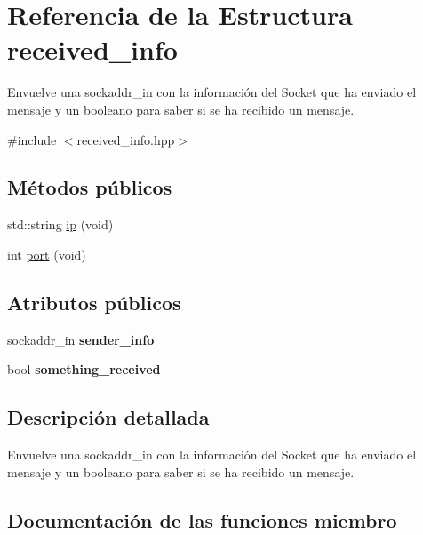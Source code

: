 \hypertarget{structreceived__info}{}\section{Referencia de la Estructura received\+\_\+info}
\label{structreceived__info}


Envuelve una sockaddr\+\_\+in con la información del Socket que ha enviado el mensaje y un booleano para saber si se ha recibido un mensaje.  




{\ttfamily \#include $<$received\+\_\+info.\+hpp$>$}

\subsection*{Métodos públicos}
\begin{DoxyCompactItemize}
\item 
std\+::string \hyperlink{structreceived__info_a0ec80b4a2270fb3df1485a339c9dbbc7}{ip} (void)
\item 
int \hyperlink{structreceived__info_a477d71d73917e058813ccf4ebb5f0269}{port} (void)
\end{DoxyCompactItemize}
\subsection*{Atributos públicos}
\begin{DoxyCompactItemize}
\item 
\mbox{\label{structreceived__info_aab4b72269198ea625744de39aad80ea5}} 
sockaddr\+\_\+in {\bfseries sender\+\_\+info}
\item 
\mbox{\label{structreceived__info_a7bedef8fd0ed79462fc64fcc69c774f8}} 
bool {\bfseries something\+\_\+received}
\end{DoxyCompactItemize}


\subsection{Descripción detallada}
Envuelve una sockaddr\+\_\+in con la información del Socket que ha enviado el mensaje y un booleano para saber si se ha recibido un mensaje. 

\subsection{Documentación de las funciones miembro}
\mbox{\label{structreceived__info_a0ec80b4a2270fb3df1485a339c9dbbc7}} 
